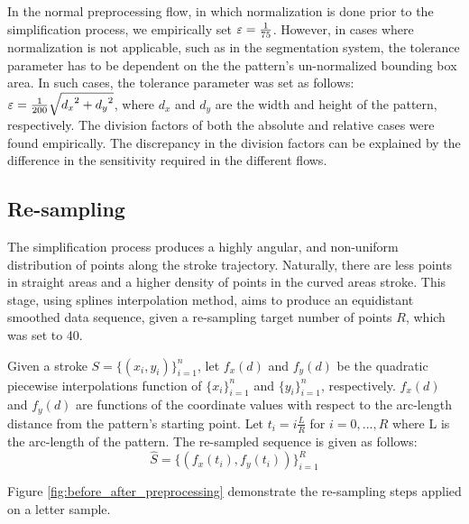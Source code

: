 \iftoggle{edit-mode}{\hspace{0pt}\marginpar{Different tolerance parameters}}{}
In the normal preprocessing flow, in which normalization is done prior to the simplification process, we empirically set $\varepsilon  = {1 \over 75}$.
However, in cases where normalization is not applicable, such as in the segmentation system, the tolerance parameter has to be dependent on the the pattern's un-normalized bounding box area. 
In such cases, the tolerance parameter was set as follows: $\varepsilon  = {1 \over {200}}\sqrt {{d_x}^2 + {d_y}^2}$, where $d_x$ and $d_y$ are the width and height of the pattern, respectively. 
The division factors of both the absolute and relative cases were found empirically. 
The discrepancy in the division factors can be explained by the difference in the sensitivity required in the different flows. 

\subsection{Re-sampling}
\iftoggle{edit-mode}{\hspace{0pt}\marginpar{Goal}}{}
The simplification process produces a highly angular, and non-uniform distribution of points along the stroke trajectory.
Naturally, there are less points in straight areas and a higher density of points in the curved areas stroke. 
This stage, using splines interpolation method, aims to produce an equidistant smoothed data sequence, given a re-sampling target number of points $R$, which was set to 40. 

\iftoggle{edit-mode}{\hspace{0pt}\marginpar{Approach}}{}
Given a stroke $S=\{(x_i,y_i)\}_{i=1}^{n}$, let $f_{x}(d)$ and $f_{y}(d)$ be the quadratic piecewise interpolations function of $\{x_i\}_{i=1}^{n}$ and $\{y_i\}_{i=1}^{n}$, respectively. 
$f_{x}(d)$ and $f_{y}(d)$ are functions of the coordinate values with respect to the arc-length distance from the pattern's starting point. 
Let $t_i=i\frac{L}{R}$ for $i=0,...,R$ where L is the arc-length of the pattern.
The re-sampled sequence is given as follows:
\begin{equation}
\widehat{S}=\{(f_x(t_i),f_y(t_i))\}_{i=1}^{R}
\end{equation}

Figure \ref{fig:before_after_preprocessing} demonstrate the re-sampling steps applied on a letter sample.

